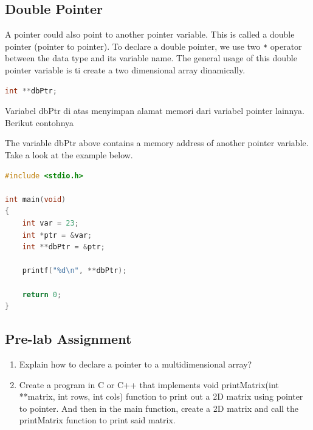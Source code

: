 \subsection{Double Pointer}
A pointer could also point to another pointer variable. This is called a double pointer (pointer to pointer).
To declare a double pointer, we use two \verb|*| operator between the data type and its variable name.
The general usage of this double pointer variable is ti create a two dimensional array dinamically.
\begin{lstlisting}[language=c]
    int **dbPtr;
\end{lstlisting}
Variabel dbPtr di atas menyimpan alamat memori dari variabel pointer lainnya. \\
Berikut contohnya

The variable dbPtr above contains a memory address of another pointer variable.\\
Take a look at the example below.
\begin{lstlisting}[language=c,  caption={Double Pointer Example}]
#include <stdio.h>

int main(void)
{
    int var = 23;
    int *ptr = &var;
    int **dbPtr = &ptr;

    printf("%d\n", **dbPtr);
        
    return 0;
}
\end{lstlisting}

\subsection{Pre-lab Assignment}
\begin{enumerate}
    \item Explain how to declare a pointer to a multidimensional array?
    \item Create a program in C or C++ that implements void printMatrix(int **matrix, int rows, int cols) function
          to print out a 2D matrix using pointer to pointer. And then in the main function, create a 2D matrix and call the
          printMatrix function to print said matrix.
\end{enumerate}

